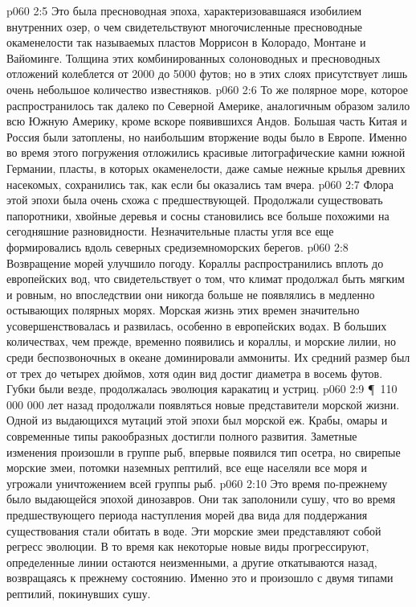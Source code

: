 \vs p060 2:5 Это была пресноводная эпоха, характеризовавшаяся изобилием внутренних озер, о чем свидетельствуют многочисленные пресноводные окаменелости так называемых пластов Моррисон в Колорадо, Монтане и Вайоминге. Толщина этих комбинированных солоноводных и пресноводных отложений колеблется от 2000 до 5000 футов; но в этих слоях присутствует лишь очень небольшое количество известняков.
\vs p060 2:6 То же полярное море, которое распространилось так далеко по Северной Америке, аналогичным образом залило всю Южную Америку, кроме вскоре появившихся Андов. Большая часть Китая и Россия были затоплены, но наибольшим вторжение воды было в Европе. Именно во время этого погружения отложились красивые литографические камни южной Германии, пласты, в которых окаменелости, даже самые нежные крылья древних насекомых, сохранились так, как если бы оказались там вчера.
\vs p060 2:7 Флора этой эпохи была очень схожа с предшествующей. Продолжали существовать папоротники, хвойные деревья и сосны становились все больше похожими на сегодняшние разновидности. Незначительные пласты угля все еще формировались вдоль северных средиземноморских берегов.
\vs p060 2:8 Возвращение морей улучшило погоду. Кораллы распространились вплоть до европейских вод, что свидетельствует о том, что климат продолжал быть мягким и ровным, но впоследствии они никогда больше не появлялись в медленно остывающих полярных морях. Морская жизнь этих времен значительно усовершенствовалась и развилась, особенно в европейских водах. В больших количествах, чем прежде, временно появились и кораллы, и морские лилии, но среди беспозвоночных в океане доминировали аммониты. Их средний размер был от трех до четырех дюймов, хотя один вид достиг диаметра в восемь футов. Губки были везде, продолжалась эволюция каракатиц и устриц.
\vs p060 2:9 \P\ 110 000 000 лет назад продолжали появляться новые представители морской жизни. Одной из выдающихся мутаций этой эпохи был морской еж. Крабы, омары и современные типы ракообразных достигли полного развития. Заметные изменения произошли в группе рыб, впервые появился тип осетра, но свирепые морские змеи, потомки наземных рептилий, все еще населяли все моря и угрожали уничтожением всей группы рыб.
\vs p060 2:10 Это время по\hyp{}прежнему было выдающейся эпохой динозавров. Они так заполонили сушу, что во время предшествующего периода наступления морей два вида для поддержания существования стали обитать в воде. Эти морские змеи представляют собой регресс эволюции. В то время как некоторые новые виды прогрессируют, определенные линии остаются неизменными, а другие откатываются назад, возвращаясь к прежнему состоянию. Именно это и произошло с двумя типами рептилий, покинувших сушу.
